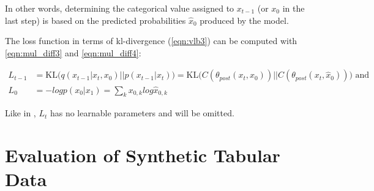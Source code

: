 In other words, determining the categorical value assigned to $x_{t-1}$ (or $x_0$ in the last step) is based on the predicted probabilities $\hat{x}_0$ produced by the model.


The loss function in terms of \gls{kl}-divergence (\autoref{eqn:vlb3}) can be computed with \autoref{eqn:mul_diff3} and \autoref{eqn:mul_diff4}:

\begin{equation}
  \begin{align*}
    \label{eqn:mul_diff5}
    L_{t-1}&=\text{KL}\Big(q(x_{t-1}|x_t, x_0)\big\vert\big\vert p(x_{t-1}|x_t)\Big) = \text{KL}\Big(C(\theta_{post}(x_t, x_0))\big\vert\big\vert C(\theta_{post}(x_t, \hat{x}_0))\Big) \textrm{ and}\\
    L_{0} &= -logp(x_0|x_1) = \sum_{k}^{}x_{0,k}log\hat{x}_{0,k}
  \end{align*}
\end{equation}

Like in \cite{ho2020DenoisingDiffusionProbabilistic}, $L_{t}$ has no learnable parameters and will be omitted.


\section{Evaluation of Synthetic Tabular Data}
\label{ch:preliminaries-evaluationOfSyntheticTabularData}

